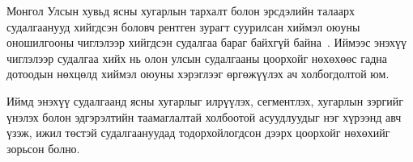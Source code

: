 Монгол Улсын хувьд ясны хугарлын тархалт болон эрсдэлийн талаарх судалгаанууд хийгдсэн боловч рентген зурагт суурилсан хиймэл оюуны оношилгооны чиглэлээр хийгдсэн судалгаа бараг байхгүй байна~\cite{ref20,ref21}. Иймээс энэхүү чиглэлээр судалгаа хийх нь олон улсын судалгааны цоорхойг нөхөхөөс гадна дотоодын нөхцөлд хиймэл оюуны хэрэглээг өргөжүүлэх ач холбогдолтой юм.

Иймд энэхүү судалгаанд ясны хугарлыг илрүүлэх, сегментлэх, хугарлын зэргийг үнэлэх болон эдгэрэлтийн таамаглалтай холбоотой асуудлуудыг нэг хүрээнд авч үзэж, ижил төстэй судалгаануудад тодорхойлогдсон дээрх цоорхойг нөхөхийг зорьсон болно.
